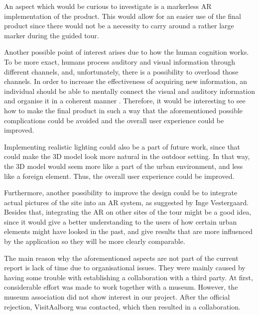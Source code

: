 An aspect which would be curious to investigate is a markerless AR implementation of the product. This would allow for an easier use of the final product since there would not be a necessity to carry around a rather large marker during the guided tour.
  
Another possible point of interest arises due to how the human cognition works. To be more exact, humans process auditory and visual information through different channels, and, unfortunately, there is a possibility to overload those channels. In order to increase the effectiveness of acquiring new information, an individual should be able to mentally connect the visual and auditory information and organise it in a coherent manner \cite{audiovisual_learning}. Therefore, it would be interesting to see how to make the final product in such a way that the aforementioned possible complications could be avoided and the overall user experience could be improved.

Implementing realistic lighting could also be a part of future work, since that could make the 3D model look more natural in the outdoor setting. In that way, the 3D model would seem more like a part of the urban environment, and less like a foreign element. Thus, the overall user experience could be improved.

Furthermore, another possibility to improve the design could be to integrate actual pictures of the site into an AR system, as suggested by Inge Vestergaard. Besides that, integrating the AR on other sites of the tour might be a good idea, since it would give a better understanding to the users of how certain urban elements might have looked in the past, and give results that are more influenced by the application so they will be more clearly comparable. 

The main reason why the aforementioned aspects are not part of the current report is lack of time due to organisational issues. They were mainly caused by having some trouble with establishing a collaboration with a third party. At first, considerable effort was made to work together with a museum. However, the museum association did not show interest in our project. After the official rejection, VisitAalborg was contacted, which then resulted in a collaboration. 

